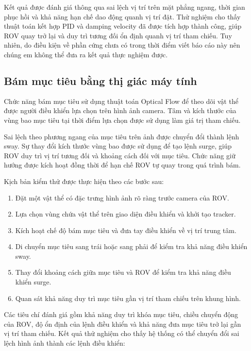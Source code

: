 \documentclass[../DoAn.tex]{subfiles}
\begin{document}
Kết quả được đánh giá thông qua sai lệch vị trí trên mặt phẳng ngang, thời gian phục hồi và khả năng hạn chế dao động quanh vị trí đặt. Thử nghiệm cho thấy thuật toán kết hợp PID và damping velocity đã được tích hợp thành công, giúp ROV quay trở lại và duy trì tương đối ổn định quanh vị trí tham chiếu. Tuy nhiên, do điều kiện về phần cứng chưa có trong thời điểm viết báo cáo này nên chúng em không thể đưa ra kết quả thực nghiệm được.

\subsection{Bám mục tiêu bằng thị giác máy tính}

Chức năng bám mục tiêu sử dụng thuật toán Optical Flow để theo dõi vật thể được người điều khiển lựa chọn trên hình ảnh camera. Tâm và kích thước của vùng bao mục tiêu tại thời điểm lựa chọn được sử dụng làm giá trị tham chiếu.

Sai lệch theo phương ngang của mục tiêu trên ảnh được chuyển đổi thành lệnh sway. Sự thay đổi kích thước vùng bao được sử dụng để tạo lệnh surge, giúp ROV duy trì vị trí tương đối và khoảng cách đối với mục tiêu. Chức năng giữ hướng được kích hoạt đồng thời để hạn chế ROV tự quay trong quá trình bám.

Kịch bản kiểm thử được thực hiện theo các bước sau:

\begin{enumerate}
\item Đặt một vật thể có đặc trưng hình ảnh rõ ràng trước camera của ROV.
\item Lựa chọn vùng chứa vật thể trên giao diện điều khiển và khởi tạo tracker.
\item Kích hoạt chế độ bám mục tiêu và đưa tay điều khiển về vị trí trung tâm.
\item Di chuyển mục tiêu sang trái hoặc sang phải để kiểm tra khả năng điều khiển sway.
\item Thay đổi khoảng cách giữa mục tiêu và ROV để kiểm tra khả năng điều khiển surge.
\item Quan sát khả năng duy trì mục tiêu gần vị trí tham chiếu trên khung hình.
\end{enumerate}

Các tiêu chí đánh giá gồm khả năng duy trì khóa mục tiêu, chiều chuyển động của ROV, độ ổn định của lệnh điều khiển và khả năng đưa mục tiêu trở lại gần vị trí tham chiếu. Kết quả thử nghiệm cho thấy hệ thống có thể chuyển đổi sai lệch hình ảnh thành các lệnh điều khiển:
\end{document}
